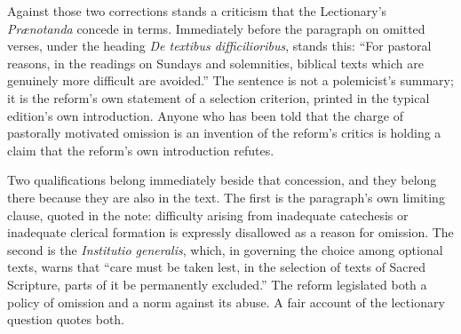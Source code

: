 Against those two corrections stands a criticism that the Lectionary's \emph{Prænotanda} concede in terms. Immediately before the paragraph on omitted verses, under the heading \emph{De textibus difficilioribus}, stands this: ``For pastoral reasons, in the readings on Sundays and solemnities, biblical texts which are genuinely more difficult are avoided.'' The sentence is not a polemicist's summary; it is the reform's own statement of a selection criterion, printed in the typical edition's own introduction. Anyone who has been told that the charge of pastorally motivated omission is an invention of the reform's critics is holding a claim that the reform's own introduction refutes.

Two qualifications belong immediately beside that concession, and they belong there because they are also in the text. The first is the paragraph's own limiting clause, quoted in the note: difficulty arising from inadequate catechesis or inadequate clerical formation is expressly disallowed as a reason for omission. The second is the \emph{Institutio generalis}, which, in governing the choice among optional texts, warns that ``care must be taken lest, in the selection of texts of Sacred Scripture, parts of it be permanently excluded.'' The reform legislated both a policy of omission and a norm against its abuse. A fair account of the lectionary question quotes both.

